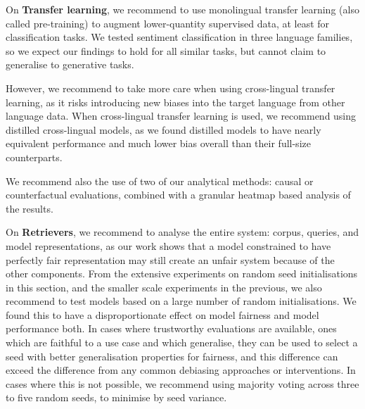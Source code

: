 On \textbf{Transfer learning}, we recommend to use monolingual transfer learning (also called pre-training) to augment lower-quantity supervised data, at least for classification tasks. We tested sentiment classification in three language families, so we expect our findings to hold for all similar tasks, but cannot claim to generalise to generative tasks.

However, we recommend to take more care when using cross-lingual transfer learning, as it risks introducing new biases into the target language from other language data. When cross-lingual transfer learning is used, we recommend using distilled cross-lingual models, as we found distilled models to have nearly equivalent performance and much lower bias overall than their full-size counterparts. 

We recommend also the use of two of our analytical methods: causal or counterfactual evaluations, combined with a granular heatmap based analysis of the results.

On \textbf{Retrievers}, we recommend to analyse the entire system: corpus, queries, and model representations, as our work shows that a model constrained to have perfectly fair representation may still create an unfair system because of the other components. From the extensive experiments on random seed initialisations in this section, and the smaller scale experiments in the previous, we also recommend to test models based on a large number of random initialisations. We found this to have a disproportionate effect on model fairness and model performance both. In cases where trustworthy evaluations are available, ones which are faithful to a use case and which generalise, they can be used to select a seed with better generalisation properties for fairness, and this difference can exceed the difference from any common debiasing approaches or interventions. In cases where this is not possible, we recommend using majority voting across three to five random seeds, to minimise by seed variance. 



